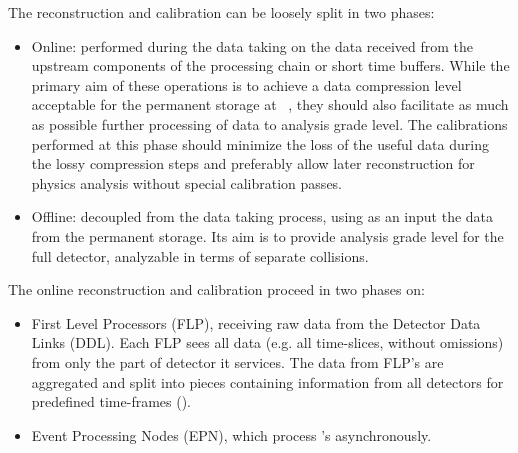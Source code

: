 The reconstruction and calibration can be loosely split in two phases:

\begin{itemize}

\item Online: performed during the data taking on the data received from the
upstream components of the processing chain or short time buffers.
While the primary aim of these operations is to achieve a data
compression level acceptable for the permanent storage at ~\cite{panelDoc}, they
should also
facilitate as much as possible further processing of data to analysis
grade level. 
The calibrations performed at this phase should minimize
the loss of the useful data during the lossy compression steps and
preferably allow later reconstruction for physics analysis without
special calibration passes.

\item Offline: decoupled from the data taking process, using as an input the
data from the permanent storage. Its aim is to provide analysis grade
level for the full detector, analyzable in terms of separate
collisions.
\end{itemize}

The online reconstruction and calibration proceed in two phases on:

\begin{itemize}
\item First Level Processors (FLP), receiving raw data from the
Detector Data Links (DDL). Each FLP sees all data (e.g. all
time-slices, without omissions)
from only the part of detector it services. The data from FLP's are 
aggregated and split into pieces containing information from all detectors for
predefined time-frames (\TF).
\item Event Processing Nodes (EPN), which process \TF's
  asynchronously.
\end{itemize}

